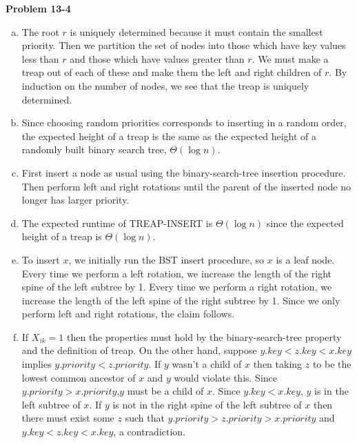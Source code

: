 \documentclass{article}
\begin{document}
\noindent\textbf{Problem 13-4}\\
\begin{enumerate}[a.]
\item The root $r$ is uniquely determined because it must contain the smallest priority.  Then we partition the set of nodes into those which have key values less than $r$ and those which have values greater than $r$.  We must make a treap out of each of these and make them the left and right children of $r$.  By induction on the number of nodes, we see that the treap is uniquely determined. \\

\item  Since choosing random priorities corresponds to inserting in a random order, the expected height of a treap is the same as the expected height of a randomly built binary search tree, $\Theta(\log n)$. \\

\item First insert a node as usual using the binary-search-tree insertion procedure.  Then perform left and right rotations until the parent of the inserted node no longer has larger priority. \\

\item The expected runtime of TREAP-INSERT is $\Theta(\log n)$ since the expected height of a treap is $\Theta(\log n)$.\\

\item To insert $x$, we initially run the BST insert procedure, so $x$ is a leaf node.  Every time we perform a left rotation, we increase the length of the right spine of the left subtree by 1.  Every time we perform a right rotation, we increase the length of the left spine of the right subtree by 1. Since we only perform left and right rotations, the claim follows. \\

\item If $X_{ik} = 1$ then the properties must hold by the binary-search-tree property and the definition of treap.  On the other hand, suppose $y.key < z.key < x.key$ implies $y.priority < z.priority$.  If $y$ wasn't a child of $x$ then taking $z$ to be the lowest common ancestor of $x$ and $y$ would violate this.  Since $y.priority > x.priority$,$y$ must be a child of $x$.  Since $y.key < x.key$, $y$ is in the left subtree of $x$.  If $y$ is not in the right spine of the left subtree of $x$ then there must exist some $z$ such that $y.priority > z.priority > x.priority$ and $y.key < z.key <x.key$, a contradiction. \\


\end{enumerate}
\end{document}
